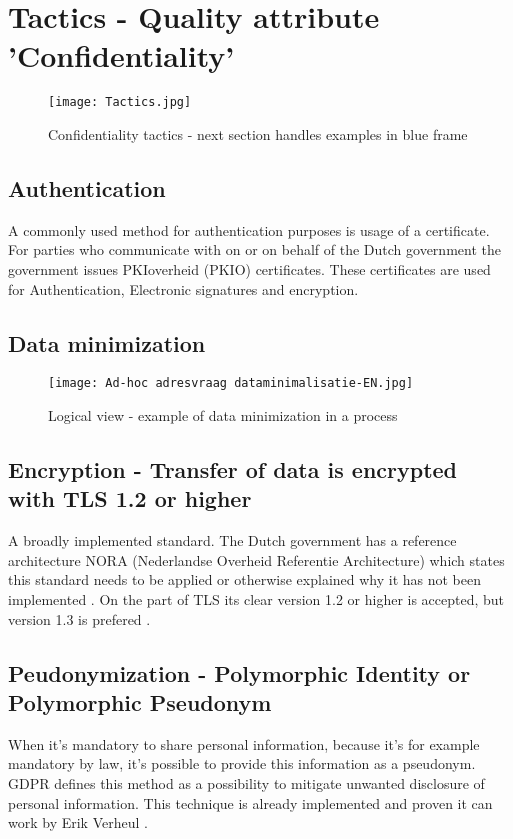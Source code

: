 \section{Tactics - Quality attribute 'Confidentiality'}
\graphicspath{ {./images/} }
\begin{figure}
\centering
\label{fig:Tactics}
\texttt{[image: Tactics.jpg]}\\
\caption{Confidentiality tactics - next section handles examples in blue frame}
\end{figure}

\subsection{Authentication}
A commonly used method for authentication purposes is usage of a certificate. For parties who communicate with on or on behalf of the Dutch government the government issues PKIoverheid (PKIO) certificates. These certificates are used for Authentication, Electronic signatures and encryption. \cite{Logius_PKIO}

\subsection{Data minimization}
\graphicspath{ {./images/} }
\begin{figure}
\centering
\label{fig:Ad-hoc}
\texttt{[image: Ad-hoc adresvraag dataminimalisatie-EN.jpg]}\\
\caption{Logical view - example of data minimization in a process}
\end{figure}

\subsection{Encryption - Transfer of data is encrypted with TLS 1.2 or higher}
A broadly implemented standard. The Dutch government has a reference architecture NORA (Nederlandse Overheid Referentie Architecture) \cite{NORA} which states this standard needs to be applied or otherwise explained why it has not been implemented \cite{NORA_PasToeOfLegUit}. On the part of TLS its clear version 1.2 or higher is accepted, but version 1.3 is prefered \cite{NORA_TLS}. 

\subsection{Peudonymization - Polymorphic Identity or Polymorphic Pseudonym}
When it's mandatory to share personal information, because it's for example mandatory by law, it's possible to provide this information as a pseudonym. GDPR \cite{GDPR} defines this method as a possibility to mitigate unwanted disclosure of personal information. 
This technique is already implemented and proven it can work by Erik Verheul \cite{VerheuleID}.

